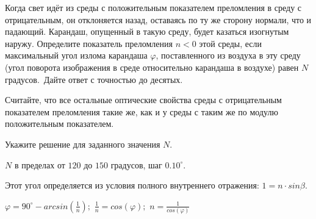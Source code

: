 
Когда свет идёт из среды с положительным показателем преломления в
среду с отрицательным, он отклоняется назад, оставаясь по ту же сторону
нормали, что и падающий. Карандаш, опущенный в такую среду, будет казаться
изогнутым наружу. Определите  показатель преломления $n < 0$
этой среды, если максимальный угол излома карандаша $\varphi$,
поставленного из воздуха в эту среду (угол 
поворота изображения в среде относительно карандаша в воздухе) равен $N$ градусов. Дайте ответ с точностью до десятых. 

Считайте, что все остальные оптические свойства среды с отрицательным показателем преломления такие же, как и у среды с таким же по модулю положительным показателем.

Укажите решение для заданного значения $N$.

\paramSection

$N$ в пределах от $120$ до $150$ градусов, шаг $0.10^{\circ}$.

\solutionSection

Этот угол определяется из условия полного внутреннего отражения: $1=n \cdot sin\beta$.


$\varphi =90^{\circ}-arcsin(\frac{1}{n});$   $\frac{1}{n}=cos(\varphi );$   $n=\frac{1}{cos(\varphi )}$ 

